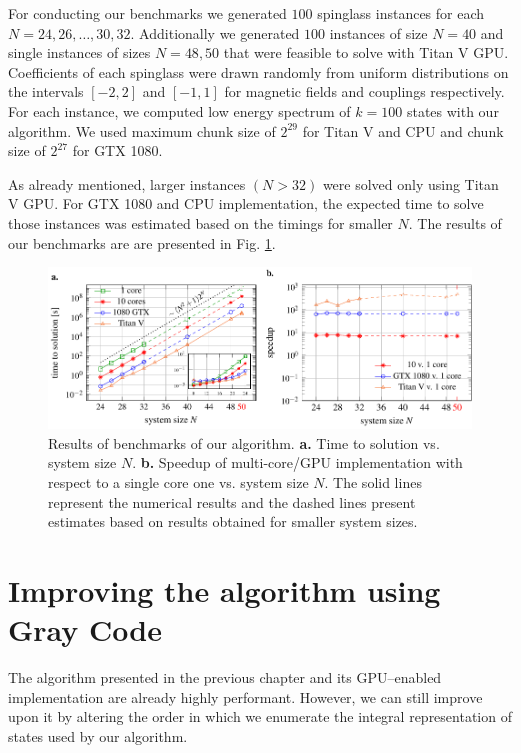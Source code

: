 For conducting our benchmarks we generated $100$ spinglass instances for each
$N=24, 26, \ldots, 30, 32$. Additionally we generated $100$ instances of size
$N=40$ and single instances of sizes $N=48, 50$ that were feasible to solve
with Titan V GPU. Coefficients of each spinglass were drawn randomly from
uniform distributions on the intervals $[-2, 2]$ and $[-1, 1]$ for magnetic
fields and couplings respectively. For each instance, we computed low energy
spectrum of $k=100$ states with our algorithm. We used maximum chunk size of
$2^{29}$ for Titan V and CPU and chunk size of $2^{27}$ for GTX 1080.

As already mentioned, larger instances $(N > 32)$ were solved only using Titan
V GPU. For GTX 1080 and CPU implementation, the expected time to solve those
instances was estimated based on the timings for smaller $N$. The results of
our benchmarks are are presented in Fig. \ref{fig:benchmark_results}.

\begin{figure}
  \centering
  \includegraphics[width=\textwidth]{figures/resultsplot_reduced.pdf}
  \caption{Results of benchmarks of our algorithm. {\textbf{a.}} Time to solution vs.
    system size $N$. {\textbf{b.}} Speedup of multi-core/GPU implementation with
    respect to a single core one vs. system size $N$. The solid lines represent the
    numerical results and the dashed lines present estimates based on results
    obtained for smaller system sizes.} \label{fig:benchmark_results}
\end{figure}

\section{Improving the algorithm using Gray Code}

The algorithm presented in the previous chapter and its GPU--enabled
implementation are already highly performant. However, we can still improve
upon it by altering the order in which we enumerate the integral representation
of states used by our algorithm.

